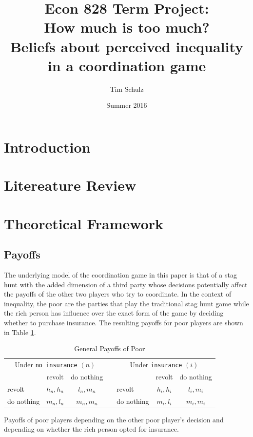 \documentclass[12pt]{article}
\title{Econ 828 Term Project:\\ How much is too much?\\
		Beliefs about perceived inequality in a coordination game}
\author{Tim Schulz}
\date{Summer 2016}
\begin{document}
	\maketitle
	\doublespacing
	\section{Introduction}
	\section{Litereature Review}
	\section{Theoretical Framework}
	\subsection{Payoffs}
	The underlying model of the coordination game in this paper is that of a 
	stag hunt with the added dimension of a third party whose decisions 
	potentially affect the payoffs of the other two players who try to 
	coordinate. In the context of inequality, the poor are the parties that 
	play the traditional stag hunt game while the rich person has influence 
	over the exact form of the game by deciding whether to purchase insurance. 
	The resulting payoffs for poor players are shown in Table 
	\ref{table:gpayoff}.
	
	\begin{table}[!htbp]
		\caption{General Payoffs of Poor}
		\label{table:gpayoff}
		\begin{center}
		\begin{tabular}{|l|c|c|c|l|c|c|}
			\multicolumn{3}{c}{Under \texttt{no insurance} $(n)$} &
			\multicolumn{1}{c}{} &
			\multicolumn{3}{c}{Under \texttt{insurance} $(i)$}\\
			\cline{1-3}\cline{5-7}
			& revolt & do nothing & & & revolt & do nothing\\
			\cline{1-3}\cline{5-7}
			revolt & $h_n, h_n$ & $l_n, m_n$ && revolt & $h_i, h_i$ & $l_i, 
			m_i$\\
			\cline{1-3}\cline{5-7}
			do nothing & $m_n, l_n$ & $m_n, m_n$ && do nothing & $m_i, l_i$ & 
			$m_i, m_i$\\
			\cline{1-3}\cline{5-7}
		\end{tabular}
		\end{center}
		\footnotesize
		Payoffs of poor players depending on the other poor player's decision 
		and depending on whether the rich person opted for insurance. 
	\end{table}
	
\end{document}
